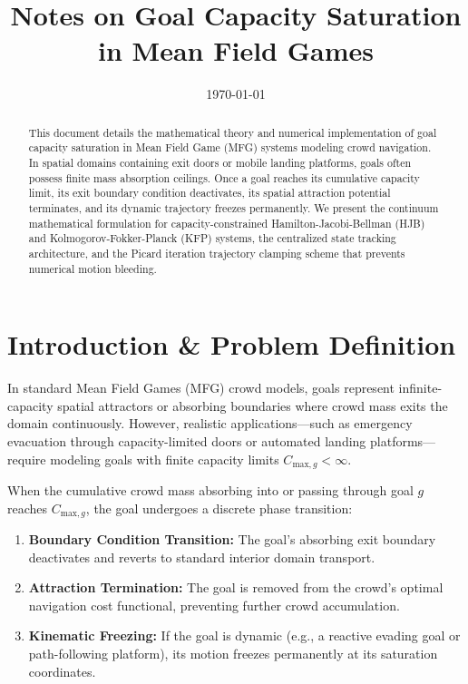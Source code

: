 \documentclass[11pt,a4paper]{article}
\title{\textbf{Notes on Goal Capacity Saturation in Mean Field Games}}
\date{\today}
\begin{document}
\maketitle

\begin{abstract}
This document details the mathematical theory and numerical implementation of goal capacity saturation in Mean Field Game (MFG) systems modeling crowd navigation. In spatial domains containing exit doors or mobile landing platforms, goals often possess finite mass absorption ceilings. Once a goal reaches its cumulative capacity limit, its exit boundary condition deactivates, its spatial attraction potential terminates, and its dynamic trajectory freezes permanently. We present the continuum mathematical formulation for capacity-constrained Hamilton-Jacobi-Bellman (HJB) and Kolmogorov-Fokker-Planck (KFP) systems, the centralized state tracking architecture, and the Picard iteration trajectory clamping scheme that prevents numerical motion bleeding.
\end{abstract}

\section{Introduction \& Problem Definition}

In standard Mean Field Games (MFG) crowd models, goals represent infinite-capacity spatial attractors or absorbing boundaries where crowd mass exits the domain continuously. However, realistic applications—such as emergency evacuation through capacity-limited doors or automated landing platforms—require modeling goals with finite capacity limits $C_{\text{max}, g} < \infty$.

When the cumulative crowd mass absorbing into or passing through goal $g$ reaches $C_{\text{max}, g}$, the goal undergoes a discrete phase transition:
\begin{enumerate}
    \item \textbf{Boundary Condition Transition:} The goal's absorbing exit boundary deactivates and reverts to standard interior domain transport.
    \item \textbf{Attraction Termination:} The goal is removed from the crowd's optimal navigation cost functional, preventing further crowd accumulation.
    \item \textbf{Kinematic Freezing:} If the goal is dynamic (e.g., a reactive evading goal or path-following platform), its motion freezes permanently at its saturation coordinates.
\end{enumerate}
\end{document}
